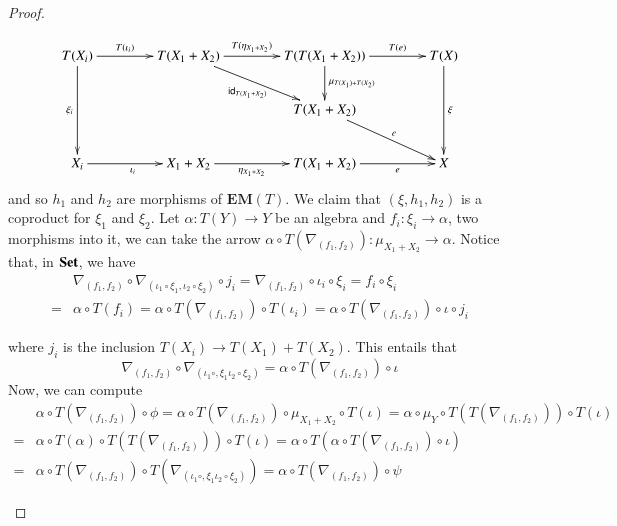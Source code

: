 \documentclass[12pt]{article}
\theoremstyle{definition}
\newcommand{\Set}{\textbf{\textup{Set}}}
\newcommand{\eim}[1]{\mathbf{EM}{(#1)}}
\numberwithin{equation}{section}
\newcommand{\id}[1]{\mathsf{id}_{#1}}
\begin{document}
\begin{proof}
\begin{itemize}
	\[\xymatrix@C=40pt{
		T(X_i)\ar[r]^-{T(\iota_i)}\ar[dd]_-{\xi_i }& T(X_1+X_2)\ar[r]^-{T(\eta_{X_1+X_2})}\ar[dr]_-{\id{T(X_1+X_2)}} & T(T(X_1+X_2))\ar[r]^-{T(e)}\ar[d]^-{\mu_{T(X_1)+T(X_2)}} & T(X)\ar[dd]^-{\xi} \\
		& &T(X_1+X_2)\ar[dr]^-{e}&\\
		X_i\ar[r]_{\iota_i} &X_1+X_2\ar[r]_-{\eta_{X_1+X_2}} & T(X_1+X_2)\ar[r]_-{e}&X}
	\]
	and so $h_1$ and $h_2$ are morphisms of $\eim{T}$. We claim that $(\xi, h_1, h_2)$ is a coproduct for $\xi_1$ and $\xi_2$. Let $\alpha:T(Y)\rightarrow Y$ be an algebra and $f_i:\xi_i\rightarrow \alpha$, two morphisms into it, we can take the arrow $\alpha\circ T(\nabla_{(f_1,f_2)}):\mu_{X_1+X_2}\rightarrow \alpha$. Notice that, in $\Set$, we have
	\begin{align*}&\nabla_{(f_1,f_2)}\circ \nabla_{(\iota_1\circ \xi_1, \iota_2\circ \xi_2)}\circ j_i= 	\nabla_{(f_1,f_2)}\circ \iota_i\circ \xi_i=f_i\circ \xi_i\\=&\alpha \circ T(f_i)=\alpha \circ T(	\nabla_{(f_1,f_2)}) \circ T(\iota_i)=\alpha \circ T(	\nabla_{(f_1,f_2)})\circ \iota \circ j_i
	\end{align*}
	\iffalse 
	\begin{align*}
	\nabla_{(f_1,f_2)}\circ \nabla_{(\iota_1\circ \xi_1, \iota_2\circ \xi_2)}\circ j_i&= 	\nabla_{(f_1,f_2)}\circ \iota_i\circ \xi_i=f_i\circ \xi_i=\alpha \circ T(f_i)=\alpha \circ \nabla_{(T(f_1), T(f_2))}\circ j_i\\
	\alpha \circ T(	\nabla_{(f_1,f_2)})\circ \iota \circ j_i&=\alpha \circ T(	\nabla_{(f_1,f_2)}) \circ T(\iota_i)=\alpha \circ T(f_i)=\alpha \circ \nabla_{(T(f_1), T(f_2))}\circ j_i
	\end{align*} 
\fi 
	where $j_i$ is the inclusion $T(X_i)\rightarrow T(X_1)+T(X_2)$. This entails that 
	\[	\nabla_{(f_1,f_2)}\circ \nabla_{(\iota_1\circ, \xi_1 \iota_2\circ \xi_2)}=\alpha \circ T(	\nabla_{(f_1,f_2)})\circ \iota\]
Now, we can compute
	\begin{align*}&\alpha\circ T(\nabla_{(f_1,f_2)})\circ \phi =\alpha\circ T(\nabla_{(f_1,f_2)})\circ \mu_{X_1+X_2}\circ T(\iota)=\alpha \circ \mu_Y\circ T(T(\nabla_{(f_1,f_2)}))\circ T(\iota)\\=&\alpha \circ T(\alpha)\circ T(T(\nabla_{(f_1,f_2)}))\circ T(\iota)=\alpha \circ T(\alpha \circ T(	\nabla_{(f_1,f_2)})\circ \iota)\\=&\alpha \circ T(\nabla_{(f_1,f_2)})\circ T(\nabla_{(\iota_1\circ, \xi_1 \iota_2\circ \xi_2)})=\alpha \circ T(\nabla_{(f_1,f_2)})\circ \psi 
	\end{align*}

\end{itemize}
\end{proof}
\end{document}
